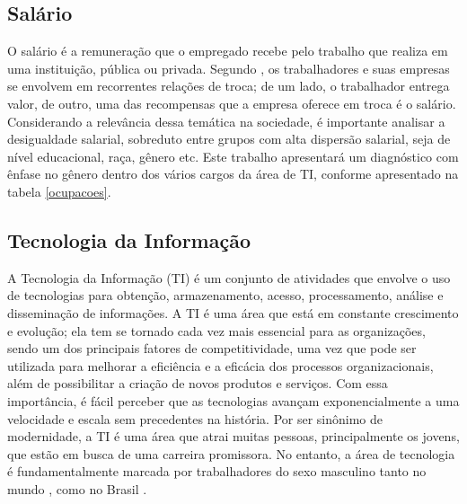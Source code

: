 \subsection{Salário}

O salário é a remuneração que o empregado recebe pelo trabalho que realiza em uma instituição, pública ou privada. Segundo \cite{kryscynski2021firm}, os trabalhadores e suas empresas se envolvem em recorrentes relações de troca; de um lado, o trabalhador entrega valor, de outro, uma das recompensas que a empresa oferece em troca é o salário.
Considerando a relevância dessa temática na sociedade, é importante analisar a 
 desigualdade salarial, sobreduto entre grupos com alta dispersão salarial, seja de nível educacional, raça, gênero etc. Este trabalho apresentará um diagnóstico com ênfase no gênero dentro dos vários cargos da área de TI, conforme apresentado na tabela \ref{ocupacoes}.

 \subsection{Tecnologia da Informação}

A Tecnologia da Informação (TI) é um conjunto de atividades que envolve o uso de tecnologias para obtenção, armazenamento, acesso, processamento, análise e disseminação de informações. A TI é uma área que está em constante crescimento e evolução; ela tem se tornado cada vez mais essencial para as organizações, sendo um dos principais fatores de competitividade, uma vez que pode ser utilizada para melhorar a eficiência e a eficácia dos processos  organizacionais, além de possibilitar a criação de novos produtos e serviços. Com essa importância, é fácil perceber que as tecnologias avançam exponencialmente a uma velocidade e escala sem precedentes na história. Por ser sinônimo de modernidade, a TI é uma área que atrai muitas pessoas, principalmente os jovens, que estão em busca de uma carreira promissora. No entanto, a área de tecnologia é fundamentalmente marcada por trabalhadores do sexo masculino tanto no mundo \cite{de2021evidencias}, como no Brasil \cite{nunes2016genero}.